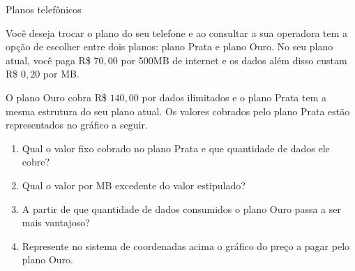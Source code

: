 \clearpage
\begin{task}{Planos telefônicos}

Você deseja trocar o plano do seu telefone e ao consultar a sua operadora tem a opção de escolher entre dois planos: plano Prata e plano Ouro. No seu plano atual, você paga R\$ $70{,}00$ por 500MB de internet e os dados além disso custam R\$ $0{,}20$ por MB. 

O plano Ouro cobra R\$ $140{,}00$ por dados ilimitados e o plano Prata tem a mesma estrutura do seu plano atual. Os valores cobrados pelo plano Prata estão representados no gráfico a seguir.

\begin{figure}[H]
\centering


\end{figure}

\begin{enumerate}
\item Qual o valor fixo cobrado no plano Prata e que quantidade de dados ele cobre?
\item Qual o valor por MB excedente do valor estipulado?
\item A partir de que quantidade de dados consumidos o plano Ouro passa a ser mais vantajoso?
\item Represente no sistema de coordenadas acima o gráfico do preço a pagar pelo plano Ouro.
\end{enumerate}

\end{task}

\clearpage

